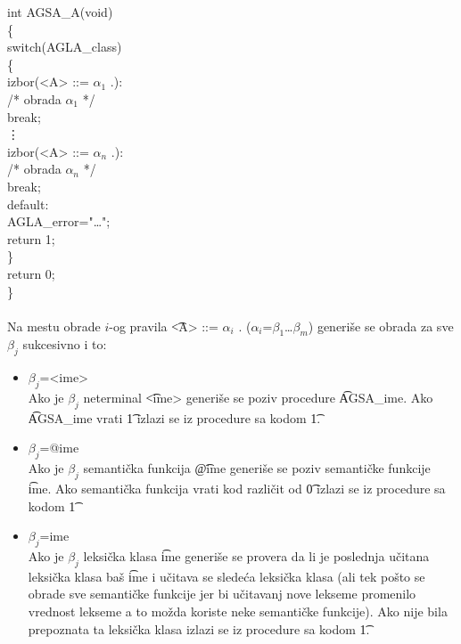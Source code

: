       {
        int AGSA\_A(void)\\
        \{\\
        {\s\s}switch(AGLA\_class)\\
        {\s\s}\{\\
        {\s\s\s\s}izbor(<A> ::= $\alpha_{1}$ .):\\
        {\s\s\s\s\s\s}/* obrada $\alpha_{1}$ */\\
        {\s\s\s\s\s\s}break;\\
        {\s\s\s\s}\vdots\\
        {\s\s\s\s}izbor(<A> ::= $\alpha_{n}$ .):\\
        {\s\s\s\s\s\s}/* obrada $\alpha_{n}$ */\\
        {\s\s\s\s\s\s}break;\\
        {\s\s\s\s}default:\\
        {\s\s\s\s\s\s}AGLA\_error="\ldots";\\
        {\s\s\s\s\s\s}return 1;\\
        {\s\s}\}\\
        {\s\s}return 0;\\
        \}\\
      }\\
      Na mestu obrade $i$-og pravila \t{<A> ::= $\alpha_{i}$ .}
      (\t{$\alpha_{i}$=$\beta_{1}$\ldots$\beta_{m}$}) generi\v se se
      obrada za sve $\beta_{j}$ sukcesivno i to:
      \begin{itemize}
        \item
        {
          \t{$\beta_{j}$=<ime>}\\
          Ako je $\beta_{j}$ neterminal \t{<ime>} generi\v se se poziv
          procedure \t{AGSA\_ime}.
          Ako \t{AGSA\_ime} vrati \t{1} izlazi se iz procedure sa kodom \t{1}.
        }
        \item
        {
          \t{$\beta_{j}$=@ime}\\
          Ako je $\beta_{j}$ semanti\v cka funkcija \t{@ime} generi\v se
          se poziv semanti\v cke funkcije \t{ime}.
          Ako semanti\v cka funkcija vrati kod razli\v cit od \t{0} izlazi
          se iz procedure sa kodom \t{1}
        }
        \item
        {
          \t{$\beta_{j}$=ime}\\
          Ako je $\beta_{j}$ leksi\v cka klasa \t{ime} generi\v se se
          provera da li je poslednja u\v citana leksi\v cka klasa ba\v s
          \t{ime} i u\v citava se slede\'ca leksi\v cka klasa (ali tek
          po\v sto se obrade sve semanti\v cke funkcije jer bi
          u\v citavanj nove lekseme promenilo vrednost lekseme a to
          mo\v zda koriste neke semanti\v cke funkcije).
          Ako nije bila prepoznata ta leksi\v cka klasa izlazi se iz
          procedure sa kodom \t{1}.
        }
      \end{itemize}
